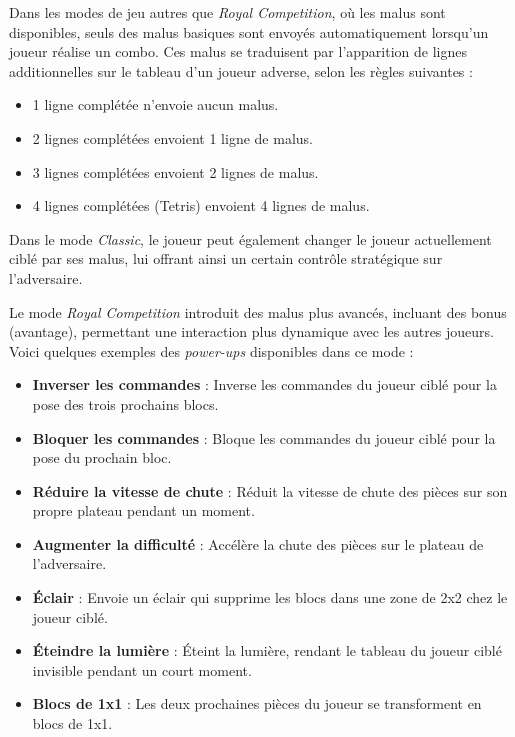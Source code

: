 \documentclass{report}
\begin{document}
\noindent Dans les modes de jeu autres que \emph{Royal Competition}, où les malus sont disponibles, seuls des malus basiques sont envoyés automatiquement lorsqu'un joueur réalise un combo. Ces malus se traduisent par l'apparition de lignes additionnelles sur le tableau d'un joueur adverse, selon les règles suivantes :
\begin{itemize}
    \item 1 ligne complétée n'envoie aucun malus.
    \item 2 lignes complétées envoient 1 ligne de malus.
    \item 3 lignes complétées envoient 2 lignes de malus.
    \item 4 lignes complétées (Tetris) envoient 4 lignes de malus. \\
\end{itemize}

\vspace{-1em}

\noindent Dans le mode \emph{Classic}, le joueur peut également changer le joueur actuellement ciblé par ses malus, lui offrant ainsi un certain contrôle stratégique sur l’adversaire. \\

\vspace{-1em}

\noindent Le mode \emph{Royal Competition} introduit des malus plus avancés, incluant des bonus (avantage), permettant une interaction plus dynamique avec les autres joueurs. Voici quelques exemples des \textit{power-ups} disponibles dans ce mode :
\begin{itemize}
    \item \textbf{Inverser les commandes} : Inverse les commandes du joueur ciblé pour la pose des trois prochains blocs.
    \item \textbf{Bloquer les commandes} : Bloque les commandes du joueur ciblé pour la pose du prochain bloc.
    \item \textbf{Réduire la vitesse de chute} : Réduit la vitesse de chute des pièces sur son propre plateau pendant un moment.
    \item \textbf{Augmenter la difficulté} : Accélère la chute des pièces sur le plateau de l’adversaire.
    \item \textbf{Éclair} : Envoie un éclair qui supprime les blocs dans une zone de 2x2 chez le joueur ciblé.
    \item \textbf{Éteindre la lumière} : Éteint la lumière, rendant le tableau du joueur ciblé invisible pendant un court moment.
    \item \textbf{Blocs de 1x1} : Les deux prochaines pièces du joueur se transforment en blocs de 1x1.
\end{itemize}
\end{document}
